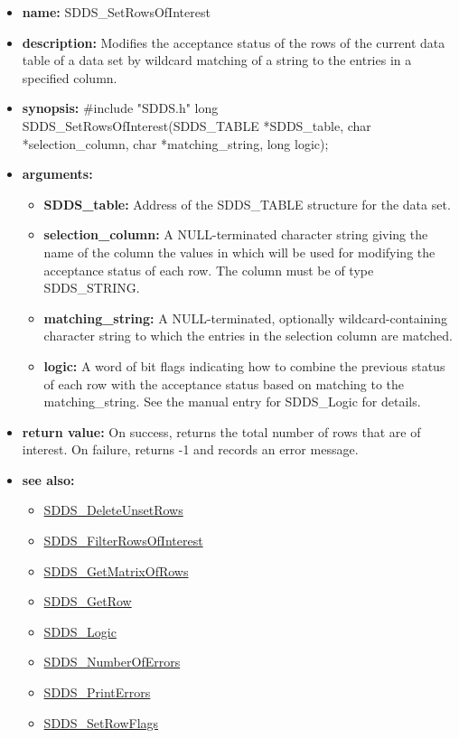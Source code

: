 \documentclass[11pt]{article}
\newcommand{\progref}[1]{\hyperref{SDDS_#1}{{\tt SDDS\_#1} (}{)}{SDDS_#1}}
\begin{document}
\begin{itemize}
\item {\bf name:}\newline
SDDS\_SetRowsOfInterest
\item {\bf description:}\newline
Modifies the acceptance status of the rows of the current data table of a data set by wildcard matching of a string to the entries in a specified column.
\item {\bf synopsis:} \#include "SDDS.h"\newline
long SDDS\_SetRowsOfInterest(SDDS\_TABLE *SDDS\_table, char *selection\_column, char *matching\_string, long logic);
\item {\bf arguments:}
\begin{itemize}
\item {\bf SDDS\_table:} Address of the SDDS\_TABLE structure for the data set.
\item {\bf selection\_column:} A NULL-terminated character string giving the name of the column the values in which will be used for modifying the acceptance status of each row. The column must be of type SDDS\_STRING.
\item {\bf matching\_string:} A NULL-terminated, optionally wildcard-containing character string to which the entries in the selection column are matched.
\item {\bf logic:} A word of bit flags indicating how to combine the previous status of each row with the acceptance status based on matching to the matching\_string. See the manual entry for SDDS\_Logic for details.
\end{itemize}
\item {\bf return value:}\newline
On success, returns the total number of rows that are of interest. On failure, returns -1 and records an error message.
\item {\bf see also:}
\begin{itemize}
\item \progref{DeleteUnsetRows}
\item \progref{FilterRowsOfInterest}
\item \progref{GetMatrixOfRows}
\item \progref{GetRow}
\item \progref{Logic}
\item \progref{NumberOfErrors}
\item \progref{PrintErrors}
\item \progref{SetRowFlags}
\end{itemize}
\end{itemize}
\end{document}

